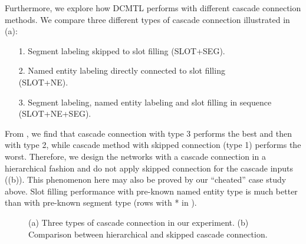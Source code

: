 Furthermore, 
we explore how DCMTL performs with different cascade connection methods.
We compare three different types of cascade connection 
illustrated in (a):
\begin{enumerate}
\item[1.]
	Segment labeling skipped to slot filling (SLOT+SEG).
\item[2.]
	Named entity labeling directly connected to slot filling \\(SLOT+NE).
\item[3.]
	Segment labeling, named entity labeling and slot filling in sequence (SLOT+NE+SEG).
\end{enumerate}
From ,
we find that cascade connection with type 3 
performs the best
and then with type 2,
while cascade method with skipped connection (type 1) performs the worst.
Therefore, we design the networks 
with a cascade connection in a hierarchical fashion
and do not apply skipped connection for the cascade 
inputs ((b)).
This phenomenon here may also be proved by our ``cheated'' case study above.
Slot filling performance with pre-known named entity type is 
much better than with pre-known segment type
(rows with * in ).
\begin{figure}[h]
	\centering
	\caption{(a) Three types of cascade connection in our experiment.
		(b) Comparison between hierarchical and skipped cascade connection.}
	\label{fig:cascade_connection_type}
\end{figure}
